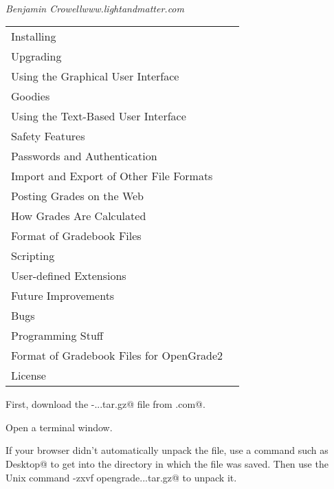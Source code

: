 \documentclass{opengrade_doc}
\begin{document}
\parafmt
{} \\
\emph{Benjamin Crowell}\hfill{}\emph{www.lightandmatter.com}

\vspace{8mm}


\noindent\large\begin{tabular}{ll}
\hline
Installing	& \pageref{installing} \\
Upgrading       & \pageref{upgrading} \\
Using the Graphical User Interface & \pageref{gui} \\
Goodies & \pageref{goodies} \\
Using the Text-Based User Interface & \pageref{textui} \\
Safety Features & \pageref{safety}\\
Passwords and Authentication & \pageref{authentication}\\
Import and Export of Other File Formats & \pageref{import-export} \\
Posting Grades on the Web & \pageref{web} \\
How Grades Are Calculated & \pageref{howcalc} \\
Format of Gradebook Files & \pageref{format} \\
Scripting & \pageref{scripting} \\
User-defined Extensions & \pageref{extensions} \\
Future Improvements & \pageref{improve} \\
Bugs & \pageref{bugs} \\
Programming Stuff & \pageref{programming} \\
Format of Gradebook Files for OpenGrade2 & \pageref{old-format} \\
License	& \pageref{license} \\
\hline
\end{tabular}\normalsize


\label{installing}

First, download the \verb@opengrade-...tar.gz@ file from \verb@lightandmatter.com@.

Open a terminal window.

If your browser didn't automatically unpack the file,
use a command such as \verb@cd Desktop@ to get into the directory in which the file was saved.
Then use the Unix command \verb@tar -zxvf opengrade...tar.gz@ to unpack it.
\end{document}
